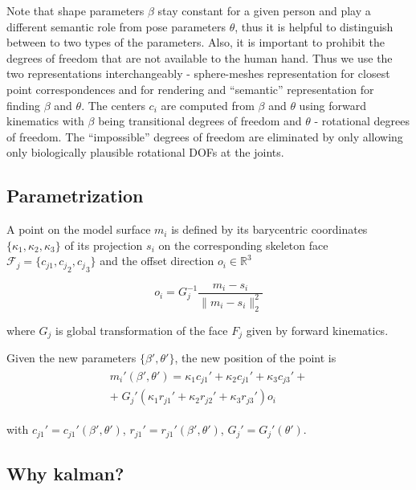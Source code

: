 Note that shape parameters $\beta$ stay constant for a given person and play a different semantic role from pose parameters $\theta$, thus it is helpful to distinguish between to two types of the parameters. Also, it is important to prohibit the degrees of freedom that are not available to the human hand. Thus we use the two representations interchangeably - sphere-meshes representation for closest point correspondences and for rendering and ``semantic'' representation for finding $\beta$ and $\theta$.
The centers $c_i$ are computed from $\beta$ and $\theta$ using forward kinematics with $\beta$ being transitional degrees of freedom and $\theta$ - rotational degrees of freedom. The ``impossible'' degrees of freedom are eliminated by only allowing only biologically plausible rotational DOFs at the joints.

\subsection {Parametrization}

A point on the model surface $m_i$ is defined by its barycentric coordinates $\{\kappa_1, \kappa_2, \kappa_3\} $ of its projection $s_i$ on the corresponding skeleton face $\mathcal{F}_j = \{c_{j1}, {c_j}_2, {c_j}_3\}$ and the offset direction $o_i \in \mathbb{R}^3$

\begin{equation}
o_i = G_j^{-1} \frac{m_i - s_i} {\| m_i - s_i \|_2^2}
\end{equation}

where $G_j$ is global transformation of the face $F_j$ given by forward kinematics.

Given the new parameters $\{ \beta', \theta' \}$, the new position of the point is
\begin{align}
\begin{split}
m_i'(\beta', \theta') = \kappa_1 c_{j1}' + \kappa_2 c_{j1}' + \kappa_3 c_{j3}' + \\
 + \;  G_j'(\kappa_1 r_{j1}' + \kappa_2 r_{j2}' + \kappa_3 r_{j3}') o_i
\end{split}
\end{align}

with $c_{j1}' = c_{j1}'(\beta', \theta')$,  $r_{j1}' = r_{j1}'(\beta', \theta')$, $G_j' =G_j'(\theta')$.

\subsection{Why kalman?}
